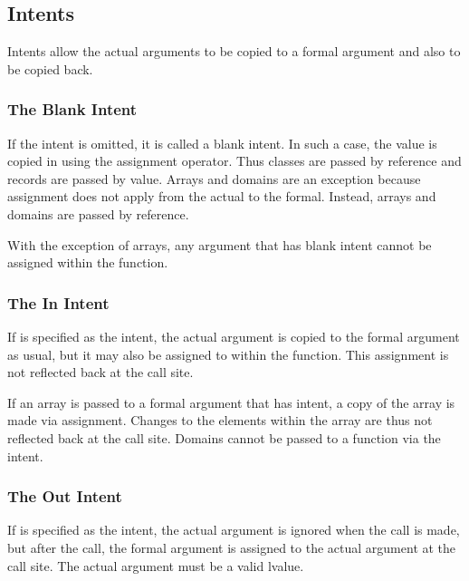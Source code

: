 \subsection{Intents}
\label{Intents}

Intents allow the actual arguments to be copied to a formal argument
and also to be copied back.

\subsubsection{The Blank Intent}
\label{The_Blank_Intent}

If the intent is omitted, it is called a blank intent.  In such a
case, the value is copied in using the assignment operator.  Thus
classes are passed by reference and records are passed by value.
Arrays and domains are an exception because assignment does not apply
from the actual to the formal.  Instead, arrays and domains are passed
by reference.

With the exception of arrays, any argument that has blank intent
cannot be assigned within the function.

\subsubsection{The In Intent}
\label{The_In_Intent}

If  is specified as the intent, the actual argument is copied
to the formal argument as usual, but it may also be assigned to within
the function.  This assignment is not reflected back at the call site.

If an array is passed to a formal argument that has  intent,
a copy of the array is made via assignment.  Changes to the elements
within the array are thus not reflected back at the call site.
Domains cannot be passed to a function via the  intent.

\subsubsection{The Out Intent}
\label{The_Out_Intent}

If  is specified as the intent, the actual argument is
ignored when the call is made, but after the call, the formal argument
is assigned to the actual argument at the call site.  The actual
argument must be a valid lvalue.

